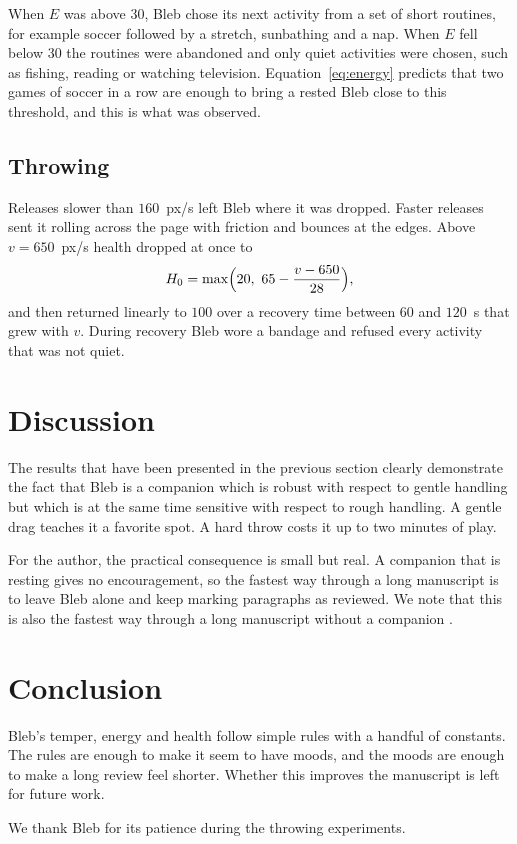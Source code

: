 \documentclass{article}
\begin{document}
When $E$ was above $30$, Bleb chose its next activity from a set of short routines, for example soccer followed by a stretch, sunbathing and a nap. When $E$ fell below $30$ the routines were abandoned and only quiet activities were chosen, such as fishing, reading or watching television. Equation~\ref{eq:energy} predicts that two games of soccer in a row are enough to bring a rested Bleb close to this threshold, and this is what was observed.

\subsection{Throwing}

Releases slower than $160$~px/s left Bleb where it was dropped. Faster releases sent it rolling across the page with friction and bounces at the edges. Above $v = 650$~px/s health dropped at once to
\begin{equation}
H_0 = \max\Bigl(20,\ 65 - \frac{v - 650}{28}\Bigr),
\end{equation}
and then returned linearly to $100$ over a recovery time between $60$ and $120$~s that grew with $v$. During recovery Bleb wore a bandage and refused every activity that was not quiet.

\section{Discussion}
\label{sec:discussion}

The results that have been presented in the previous section clearly demonstrate the fact that Bleb is a companion which is robust with respect to gentle handling but which is at the same time sensitive with respect to rough handling. A gentle drag teaches it a favorite spot. A hard throw costs it up to two minutes of play.

For the author, the practical consequence is small but real. A companion that is resting gives no encouragement, so the fastest way through a long manuscript is to leave Bleb alone and keep marking paragraphs as reviewed. We note that this is also the fastest way through a long manuscript without a companion \cite{obvious}.

\section{Conclusion}

Bleb's temper, energy and health follow simple rules with a handful of constants. The rules are enough to make it seem to have moods, and the moods are enough to make a long review feel shorter. Whether this improves the manuscript is left for future work.

\begin{acknowledgments}
We thank Bleb for its patience during the throwing experiments.
\end{acknowledgments}


\end{document}
